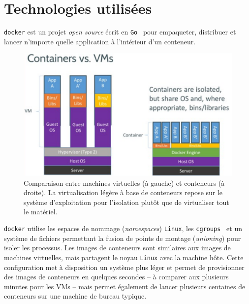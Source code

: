 \documentclass[a4paper]{article}
\begin{document}
\section*{Technologies utilis\'ees}

\texttt{docker} est un projet \emph{open source} \'ecrit en
\texttt{Go}~\cite{ref-golang} pour empaqueter, distribuer et lancer n'importe
quelle application \`a l'int\'erieur d'un conteneur.

\begin{figure}[h]
\begin{center}
\includegraphics[width=0.8\linewidth]{figs/vm-lxc.pdf}
\end{center}
\caption{\label{fig-docker-overview}Comparaison entre machines virtuelles (\`a
	gauche) et conteneurs (\`a droite).
La virtualisation l\'eg\`ere \`a base de conteneurs repose sur le syst\`eme
d'exploitation pour l'isolation plut\^ot que de virtualiser tout le
mat\'eriel.}
\end{figure}
 
\texttt{docker} utilise les espaces de nommage (\emph{namespaces})
\texttt{Linux}, les \texttt{cgroups}~\cite{ref-cgroups} et un syst\`eme de
fichiers permettant la fusion de points de montage (\emph{unioning}) pour isoler
les processus.
Les images de conteneurs sont similaires aux images de machines virtuelles, mais
partagent le noyau \texttt{Linux} avec la machine h\^ote.
Cette configuration met \`a disposition un syst\`eme plus l\'eger et permet de
provisionner des images de conteneurs en quelques secondes -- \`a comparer aux
plusieurs minutes pour les VMs -- mais permet \'egalement de lancer plusieurs
centaines de conteneurs sur une machine de bureau typique.
\end{document}
